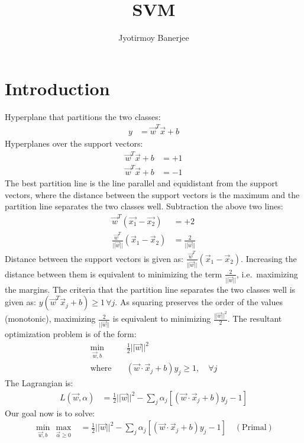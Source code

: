 \documentclass{article}
\title{SVM}
\author{Jyotirmoy Banerjee}
\begin{document}
\maketitle


\section{Introduction}
Hyperplane that partitions the two classes:
\begin{align*}
y &= \vec{w}^T\vec{x} + b
\end{align*}
Hyperplanes over the support vectors:
\begin{align*}
\vec{w}^T\vec{x} + b &= +1 \\
\vec{w}^T\vec{x} + b &= -1 
\end{align*}
The best partition line is the line parallel and equidistant from the support vectors, where the distance between the support vectors is the maximum and the partition line separates the two classes well.
Subtraction the above two lines: 
\begin{align*}
\vec{w}^T(\vec{x_1} - \vec{x_2}) &= +2 \\
\frac{\vec{w}^T}{||\vec{w}||}(\vec{x}_1 - \vec{x}_2) &= \frac{2}{||\vec{w}||} 
\end{align*}
Distance between the support vectors is given as: $\frac{\vec{w}^T}{||\vec{w}||}(\vec{x}_1 - \vec{x}_2)$. Increasing the distance between them is equivalent to minimizing the term $\frac{2}{||\vec{w}||}$, i.e.\ maximizing the margins.
The criteria that the partition line separates the two classes well is given as: $y(\vec{w}^T\vec{x}_j + b) \geq 1 \, \forall{j}$. As squaring preserves the order of the values (monotonic), maximizing $\frac{2}{||\vec{w}||}$ is equivalent to minimizing $\frac{||\vec{w}||^2}{2}$. 
The resultant optimization problem is of the form:
\begin{align*}
\min_{\vec{w},b} & \quad \frac{1}{2} ||\vec{w}||^2 \\
\mathrm{where} & \quad (\vec{w} \cdot \vec{x}_j + b)y_j \geq 1, \quad \forall j
\end{align*}
The Lagrangian is:
\begin{align*}
L(\vec{w},\alpha) & =  \frac{1}{2} ||\vec{w}||^2  - \sum_j \alpha_j [(\vec{w} \cdot \vec{x}_j + b)y_j - 1]
\end{align*}
Our goal now is to solve:
\begin{align*}
\min_{\vec{w},b} \, \max_{\vec{\alpha}\geq0} &= \frac{1}{2}||\vec{w}||^2 - \sum_j \alpha_j [(\vec{w} \cdot \vec{x}_j + b)y_j - 1] \quad \mathrm{(Primal)}
\end{align*}
\end{document}
